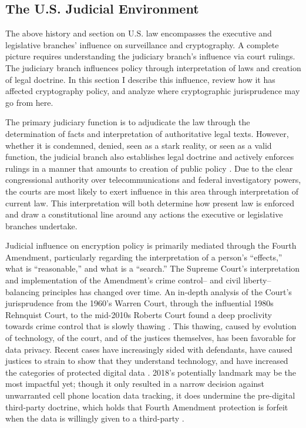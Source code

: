 \lawsend

\subsection{The U.S. Judicial Environment}
\label{sec-us-judicial}

The above history and section on U.S. law encompasses the executive and legislative branches' influence on surveillance
and cryptography. A complete picture requires understanding the judiciary branch's influence via court rulings. The
judiciary branch influences policy through interpretation of laws and creation of legal doctrine. In this section I
describe this influence, review how it has affected cryptography policy, and analyze where cryptographic jurisprudence
may go from here.

The primary judiciary function is to adjudicate the law through the determination of facts and interpretation of
authoritative legal texts. However, whether it is condemned, denied, seen as a stark reality, or seen as a valid
function, the judicial branch also establishes legal doctrine and actively enforces rulings in a manner that amounts to
creation of public policy \cite{feeley_judicial_2000}. Due to the clear congressional authority over telecommunications
and federal investigatory powers, the courts are most likely to exert influence in this area through interpretation of
current law. This interpretation will both determine how present law is enforced and draw a constitutional line around
any actions the executive or legislative branches undertake.

Judicial influence on encryption policy is primarily mediated through the Fourth Amendment, particularly regarding the
interpretation of a person's ``effects,'' what is ``reasonable,'' and what is a ``search.'' The Supreme Court's
interpretation and implementation of the Amendment's crime control-- and civil liberty--balancing principles has changed
over time. An in-depth analysis of the Court's jurisprudence from the 1960's Warren Court, through the influential 1980s
Rehnquist Court, to the mid-2010s Roberts Court found a deep proclivity towards crime control that is slowly thawing
\cite{gizzi_fourth_2016}. This thawing, caused by evolution of technology, of the court, and of the justices themselves,
has been favorable for data privacy. Recent cases have increasingly sided with defendants, have caused justices to
strain to show that they understand technology, and have increased the categories of protected digital data
\cite{gizzi_fourth_2016}. 2018's potentially landmark  may be the most impactful yet;
though it only resulted in a narrow decision against unwarranted cell phone location data tracking, it does undermine
the pre-digital third-party doctrine, which holds that Fourth Amendment protection is forfeit when the data is willingly
given to a third-party \cite{franklin_2018}.

